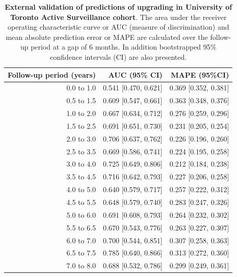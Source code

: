 \begin{table}[!htb]
\small\sf\centering
\caption{\textbf{External validation of predictions of upgrading in University of Toronto Active Surveillance cohort}. The area under the receiver operating characteristic curve or AUC (measure of discrimination) and mean absolute prediction error or MAPE are calculated over the follow-up period at a gap of 6 months. In addition bootstrapped 95\% confidence intervals (CI) are also presented.}
\label{tab:AUC_PE_Toronto}
\begin{tabular}{r|r|r}
\hline
\hline
Follow-up period (years) & AUC (95\% CI) & MAPE (95\%CI)\\ 
\hline
0.0 to 1.0 & 0.541 [0.470, 0.621] & 0.369 [0.352, 0.381]\\
0.5 to 1.5 & 0.609 [0.547, 0.661] & 0.363 [0.348, 0.376]\\
1.0 to 2.0 & 0.667 [0.634, 0.712] & 0.276 [0.259, 0.296]\\
1.5 to 2.5 & 0.691 [0.651, 0.730] & 0.231 [0.205, 0.254]\\
2.0 to 3.0 & 0.706 [0.637, 0.762] & 0.226 [0.196, 0.260]\\
2.5 to 3.5 & 0.669 [0.586, 0.741] & 0.224 [0.195, 0.258]\\
3.0 to 4.0 & 0.725 [0.649, 0.806] & 0.212 [0.184, 0.238]\\
3.5 to 4.5 & 0.716 [0.642, 0.793] & 0.227 [0.206, 0.258]\\
4.0 to 5.0 & 0.640 [0.579, 0.717] & 0.257 [0.222, 0.312]\\
4.5 to 5.5 & 0.648 [0.579, 0.740] & 0.283 [0.247, 0.326]\\
5.0 to 6.0 & 0.691 [0.608, 0.793] & 0.264 [0.232, 0.302]\\
5.5 to 6.5 & 0.670 [0.543, 0.776] & 0.263 [0.227, 0.307]\\
6.0 to 7.0 & 0.700 [0.544, 0.851] & 0.307 [0.258, 0.363]\\
6.5 to 7.5 & 0.785 [0.640, 0.866] & 0.313 [0.272, 0.360]\\
7.0 to 8.0 & 0.688 [0.532, 0.786] & 0.299 [0.249, 0.361]\\
\hline
\end{tabular}    
\end{table}

